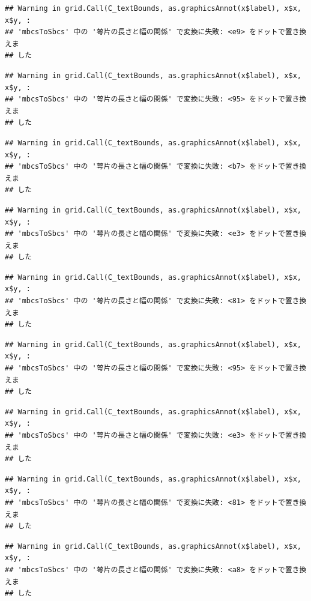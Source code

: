 \documentclass[
]{book}
\begin{document}
\begin{verbatim}
## Warning in grid.Call(C_textBounds, as.graphicsAnnot(x$label), x$x, x$y, :
## 'mbcsToSbcs' 中の '萼片の長さと幅の関係' で変換に失敗: <e9> をドットで置き換えま
## した
\end{verbatim}

\begin{verbatim}
## Warning in grid.Call(C_textBounds, as.graphicsAnnot(x$label), x$x, x$y, :
## 'mbcsToSbcs' 中の '萼片の長さと幅の関係' で変換に失敗: <95> をドットで置き換えま
## した
\end{verbatim}

\begin{verbatim}
## Warning in grid.Call(C_textBounds, as.graphicsAnnot(x$label), x$x, x$y, :
## 'mbcsToSbcs' 中の '萼片の長さと幅の関係' で変換に失敗: <b7> をドットで置き換えま
## した
\end{verbatim}

\begin{verbatim}
## Warning in grid.Call(C_textBounds, as.graphicsAnnot(x$label), x$x, x$y, :
## 'mbcsToSbcs' 中の '萼片の長さと幅の関係' で変換に失敗: <e3> をドットで置き換えま
## した
\end{verbatim}

\begin{verbatim}
## Warning in grid.Call(C_textBounds, as.graphicsAnnot(x$label), x$x, x$y, :
## 'mbcsToSbcs' 中の '萼片の長さと幅の関係' で変換に失敗: <81> をドットで置き換えま
## した
\end{verbatim}

\begin{verbatim}
## Warning in grid.Call(C_textBounds, as.graphicsAnnot(x$label), x$x, x$y, :
## 'mbcsToSbcs' 中の '萼片の長さと幅の関係' で変換に失敗: <95> をドットで置き換えま
## した
\end{verbatim}

\begin{verbatim}
## Warning in grid.Call(C_textBounds, as.graphicsAnnot(x$label), x$x, x$y, :
## 'mbcsToSbcs' 中の '萼片の長さと幅の関係' で変換に失敗: <e3> をドットで置き換えま
## した
\end{verbatim}

\begin{verbatim}
## Warning in grid.Call(C_textBounds, as.graphicsAnnot(x$label), x$x, x$y, :
## 'mbcsToSbcs' 中の '萼片の長さと幅の関係' で変換に失敗: <81> をドットで置き換えま
## した
\end{verbatim}

\begin{verbatim}
## Warning in grid.Call(C_textBounds, as.graphicsAnnot(x$label), x$x, x$y, :
## 'mbcsToSbcs' 中の '萼片の長さと幅の関係' で変換に失敗: <a8> をドットで置き換えま
## した
\end{verbatim}
\end{document}
